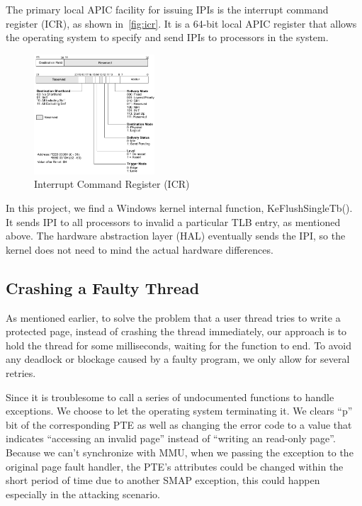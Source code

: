 The primary local APIC facility for issuing IPIs is the interrupt command register (ICR), as shown in~\autoref{fig:icr}. It is a 64-bit local APIC register that allows the operating system to specify and send IPIs to processors in the system.


\begin{figure}[th]
  \includegraphics[width=0.40\textwidth]{figures/icr}
  \centering
  \caption{Interrupt Command Register (ICR)}
  \label{fig:icr}
\end{figure}

In this project, we find a Windows kernel internal function, KeFlushSingleTb(). It sends IPI to all processors to invalid a particular TLB entry, as mentioned above. The hardware abstraction layer (HAL) eventually sends the IPI, so the kernel does not need to mind the actual hardware differences.


\subsection{Crashing a Faulty Thread}

As mentioned earlier, to solve the problem that a user thread tries to write a protected page, instead of crashing the thread immediately, our approach is to hold the thread for some milliseconds, waiting for the function to end. To avoid any deadlock or blockage caused by a faulty program, we only allow for several retries. 

Since it is troublesome to call a series of undocumented functions to handle exceptions. We choose to let the operating system terminating it. We clears ``p'' bit of the corresponding PTE as well as changing the error code to a value that indicates ``accessing an invalid page'' instead of ``writing an read-only page''. Because we can't synchronize with MMU, when we passing the exception to the original page fault handler, the PTE's attributes could be changed within the short period of time due to another SMAP exception, this could happen especially in the attacking scenario. 

